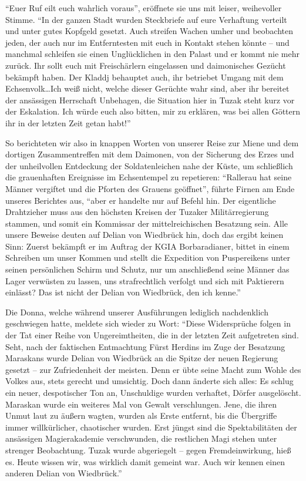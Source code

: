 ``Euer Ruf eilt euch wahrlich voraus'', eröffnete sie uns mit leiser, weihevoller Stimme. ``In der ganzen Stadt wurden Steckbriefe auf eure Verhaftung verteilt und unter gutes Kopfgeld gesetzt. Auch streifen Wachen umher und beobachten jeden, der auch nur im Entferntesten mit euch in Kontakt stehen könnte -- und manchmal schleifen sie einen Unglücklichen in den Palast und er kommt nie mehr zurück. Ihr sollt euch mit Freischärlern eingelassen und daimonisches Gezücht bekämpft haben. Der Kladdj behauptet auch, ihr betriebet Umgang mit dem Echsenvolk\dots Ich weiß nicht, welche dieser Gerüchte wahr sind, aber ihr bereitet der ansässigen Herrschaft Unbehagen, die Situation hier in Tuzak steht kurz vor der Eskalation. Ich würde euch also bitten, mir zu erklären, was bei allen Göttern ihr in der letzten Zeit getan habt!''

So berichteten wir also in knappen Worten von unserer Reise zur Miene und dem dortigen Zusammentreffen mit dem Daimonen, von der Sicherung des Erzes und der unheilvollen Entdeckung der Soldatenleichen nahe der Küste, um schließlich die grauenhaften Ereignisse im Echsentempel zu repetieren: ``Rallerau hat seine Männer vergiftet und die Pforten des Grauens geöffnet'', führte Firnen am Ende unseres Berichtes aus, ``aber er handelte nur auf Befehl hin. Der eigentliche Drahtzieher muss aus den höchsten Kreisen der Tuzaker Militärregierung stammen, und somit ein Kommissar der mittelreichischen Besatzung sein. Alle unsere Beweise deuten auf Delian von Wiedbrück hin, doch das ergibt keinen Sinn: Zuerst bekämpft er im Auftrag der KGIA Borbaradianer, bittet in einem Schreiben um unser Kommen und stellt die Expedition von Puspereikens unter seinen persönlichen Schirm und Schutz, nur um anschließend seine Männer das Lager verwüsten zu lassen, uns strafrechtlich verfolgt und sich mit Paktierern einlässt? Das ist nicht der Delian von Wiedbrück, den ich kenne.''

Die Donna, welche während unserer Ausführungen lediglich nachdenklich geschwiegen hatte, meldete sich wieder zu Wort: ``Diese Widersprüche folgen in der Tat einer Reihe von Ungereimtheiten, die in der letzten Zeit aufgetreten sind. Seht, nach der faktischen Entmachtung Fürst Herdins im Zuge der Besatzung Maraskans wurde Delian von Wiedbrück an die Spitze der neuen Regierung gesetzt -- zur Zufriedenheit der meisten. Denn er übte seine Macht zum Wohle des Volkes aus, stets gerecht und umsichtig. Doch dann änderte sich alles: Es schlug ein neuer, despotischer Ton an, Unschuldige wurden verhaftet, Dörfer ausgelöscht. Maraskan wurde ein weiteres Mal von Gewalt verschlungen. Jene, die ihren Unmut laut zu äußern wagten, wurden als Erste entfernt, bis die Übergriffe immer willkürlicher, chaotischer wurden. Erst jüngst sind die Spektabilitäten der ansässigen Magierakademie verschwunden, die restlichen Magi stehen unter strenger Beobachtung. Tuzak wurde abgeriegelt -- gegen Fremdeinwirkung, hieß es. Heute wissen wir, was wirklich damit gemeint war. Auch wir kennen einen anderen Delian von Wiedbrück.''

